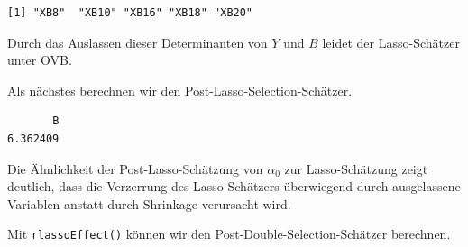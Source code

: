 \documentclass[
  a4paper,
  DIV=11,
  oneside]{scrreprt}
\newenvironment{Shaded}{\begin{snugshade}}{\end{snugshade}}
\newcommand{\AttributeTok}[1]{\textcolor[rgb]{0.40,0.45,0.13}{#1}}
\newcommand{\CommentTok}[1]{\textcolor[rgb]{0.37,0.37,0.37}{#1}}
\newcommand{\FunctionTok}[1]{\textcolor[rgb]{0.28,0.35,0.67}{#1}}
\newcommand{\NormalTok}[1]{\textcolor[rgb]{0.00,0.23,0.31}{#1}}
\newcommand{\OtherTok}[1]{\textcolor[rgb]{0.00,0.23,0.31}{#1}}
\newcommand{\SpecialCharTok}[1]{\textcolor[rgb]{0.37,0.37,0.37}{#1}}
\newcommand{\StringTok}[1]{\textcolor[rgb]{0.13,0.47,0.30}{#1}}
\begin{document}
\begin{verbatim}
[1] "XB8"  "XB10" "XB16" "XB18" "XB20"
\end{verbatim}

Durch das Auslassen dieser Determinanten von \(Y\) und \(B\) leidet der
Lasso-Schätzer unter OVB.

Als nächstes berechnen wir den Post-Lasso-Selection-Schätzer.

\begin{Shaded}
\end{Shaded}

\begin{verbatim}
       B 
6.362409 
\end{verbatim}

Die Ähnlichkeit der Post-Lasso-Schätzung von \(\alpha_0\) zur
Lasso-Schätzung zeigt deutlich, dass die Verzerrung des Lasso-Schätzers
überwiegend durch ausgelassene Variablen anstatt durch Shrinkage
verursacht wird.

Mit \texttt{rlassoEffect()} können wir den
Post-Double-Selection-Schätzer berechnen.

\begin{Shaded}
\end{Shaded}
\end{document}
